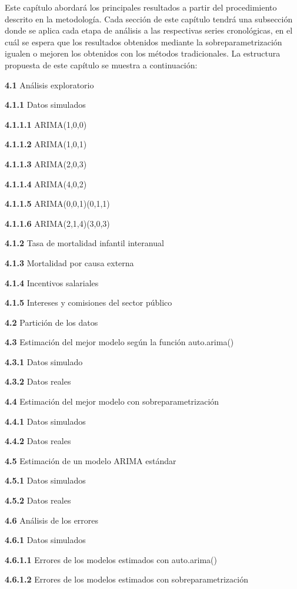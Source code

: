 \documentclass[
]{article}
\begin{document}
Este capítulo abordará los principales resultados a partir del
procedimiento descrito en la metodología. Cada sección de este capítulo
tendrá una subsección donde se aplica cada etapa de análisis a las
respectivas series cronológicas, en el cuál se espera que los resultados
obtenidos mediante la sobreparametrización igualen o mejoren los
obtenidos con los métodos tradicionales. La estructura propuesta de este
capítulo se muestra a continuación:

\textbf{4.1} Análisis exploratorio

\textbf{4.1.1} Datos simulados

\textbf{4.1.1.1} ARIMA(1,0,0)

\textbf{4.1.1.2} ARIMA(1,0,1)

\textbf{4.1.1.3} ARIMA(2,0,3)

\textbf{4.1.1.4} ARIMA(4,0,2)

\textbf{4.1.1.5} ARIMA(0,0,1)(0,1,1)

\textbf{4.1.1.6} ARIMA(2,1,4)(3,0,3)

\textbf{4.1.2} Tasa de mortalidad infantil interanual

\textbf{4.1.3} Mortalidad por causa externa

\textbf{4.1.4} Incentivos salariales

\textbf{4.1.5} Intereses y comisiones del sector público

\textbf{4.2} Partición de los datos

\textbf{4.3} Estimación del mejor modelo según la función auto.arima()

\textbf{4.3.1} Datos simulado

\textbf{4.3.2} Datos reales

\textbf{4.4} Estimación del mejor modelo con sobreparametrización

\textbf{4.4.1} Datos simulados

\textbf{4.4.2} Datos reales

\textbf{4.5} Estimación de un modelo ARIMA estándar

\textbf{4.5.1} Datos simulados

\textbf{4.5.2} Datos reales

\textbf{4.6} Análisis de los errores

\textbf{4.6.1} Datos simulados

\textbf{4.6.1.1} Errores de los modelos estimados con auto.arima()

\textbf{4.6.1.2} Errores de los modelos estimados con
sobreparametrización
\end{document}
